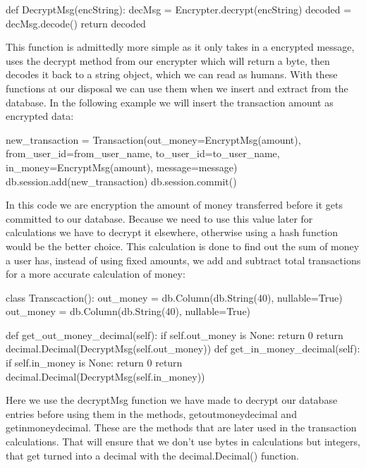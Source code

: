 \begin{python}
def DecryptMsg(encString):
decMsg = Encrypter.decrypt(encString)
decoded = decMsg.decode()
return decoded
\end{python}

This function is admittedly more simple as it only takes in a encrypted message, uses the decrypt method from our encrypter which will return a byte, then decodes it back to a string object, which we can read as humans. With these functions at our disposal we can use them when we insert and extract from the database. In the following example we will insert the transaction amount as encrypted data:
\begin{python}
new_transaction = Transaction(out_money=EncryptMsg(amount), 
                from_user_id=from_user_name, to_user_id=to_user_name,
                in_money=EncryptMsg(amount), message=message)
    db.session.add(new_transaction)
    db.session.commit()
\end{python}

In this code we are encryption the amount of money transferred before it gets committed to our database. Because we need to use this value later for calculations we have to decrypt it elsewhere, otherwise using a hash function would be the better choice. This calculation is done to find out the sum of money a user has, instead of using fixed amounts, we add and subtract total transactions for a more accurate calculation of money:

\begin{python}
class Transcaction():
out_money = db.Column(db.String(40), nullable=True)
out_money = db.Column(db.String(40), nullable=True)

def get_out_money_decimal(self):
    if self.out_money is None:
        return 0
    return decimal.Decimal(DecryptMsg(self.out_money))
def get_in_money_decimal(self):
    if self.in_money is None:
        return 0
    return decimal.Decimal(DecryptMsg(self.in_money)) 
\end{python}

\pagebreak
Here we use the decryptMsg function we have made to decrypt our database entries before using them in the methods, get\textunderscore out\textunderscore money\textunderscore decimal and \linebreak get\textunderscore in\textunderscore money\textunderscore decimal. These are the methods that are later used in the transaction calculations. That will ensure that we don't use bytes in calculations but integers, that get turned into a decimal with the decimal.Decimal() function.

